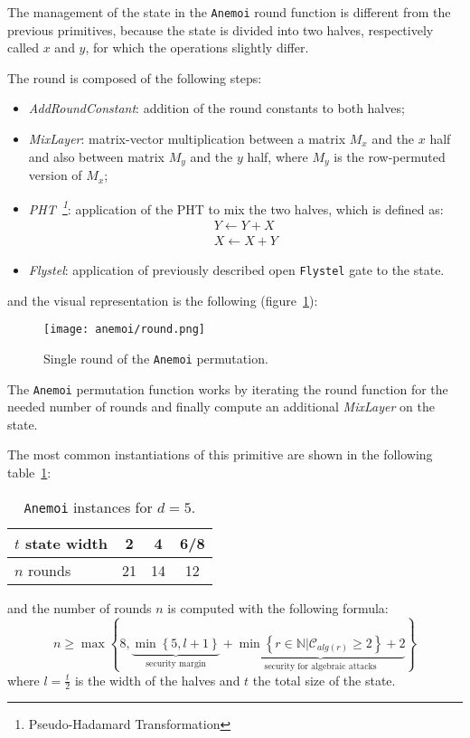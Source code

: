 \documentclass[12pt, a4paper]{report}
\begin{document}
The management of the state in the \texttt{Anemoi} round function is different from the previous primitives, because the state is divided into two halves, respectively called $x$ and $y$, for which the operations slightly differ.

The round is composed of the following steps:
\begin{itemize}
  \item \textit{AddRoundConstant}: addition of the round constants to both halves;
  \item \textit{MixLayer}: matrix-vector multiplication between a matrix $M_x$ and the $x$ half and also between matrix $M_y$ and the $y$ half, where $M_y$ is the row-permuted version of $M_x$;
  \item \textit{PHT~\footnote{Pseudo-Hadamard Transformation}}: application of the PHT to mix the two halves, which is defined as:
      \begin{gather}
        Y \leftarrow Y + X \\
        X \leftarrow X + Y
        \label{eq:pht}
      \end{gather}
  \item \textit{Flystel}: application of previously described open \texttt{Flystel} gate to the state.
\end{itemize}
and the visual representation is the following (figure~\ref{fig:anemoi}):
\begin{figure}[H]
  \begin{center}
    \texttt{[image: anemoi/round.png]}
  \end{center}
  \caption{Single round of the \texttt{Anemoi} permutation.}\label{fig:anemoi}
\end{figure}

The \texttt{Anemoi} permutation function works by iterating the round function for the needed number of rounds and finally compute an additional \textit{MixLayer} on the state.

The most common instantiations of this primitive are shown in the following table~\ref{tab:aneomiinstances}:

\begin{table}[H]
  \begin{center}
    \begin{tabular}{|l|c|c|c|}
      \hline
      $t$ state width & 2 & 4 & 6/8 \\
      \hline
      $n$ rounds & 21 & 14 & 12 \\
      \hline
    \end{tabular}
  \end{center}
  \caption{\texttt{Anemoi} instances for $d = 5$.}\label{tab:aneomiinstances}
\end{table}
and the number of rounds $n$ is computed with the following formula:
\begin{equation}
  n \ge \max \left\{ 8, \underbrace{\min \left\{ 5, l+1 \right\}}_{\text{security margin}} + \underbrace{\min \left\{ r \in \mathbb{N} | \mathcal{C}_{alg(r)} \ge 2 \right\} + 2}_{\text{security for algebraic attacks}} \right\}
  \label{eq:anemoirounds}
\end{equation}
where $l = \frac{t}{2}$ is the width of the halves and $t$ the total size of the state.
\end{document}

